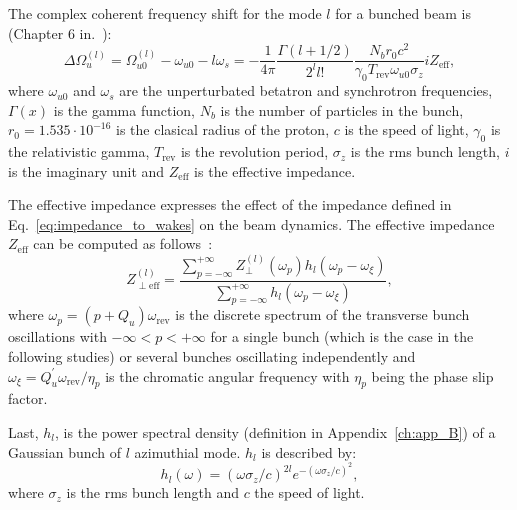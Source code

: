The complex coherent frequency shift for the mode $l$ for a bunched beam is (Chapter 6 in.~\cite{Chao:collective}): %
\begin{equation}\label{eq:complext_tune_shift_modes_m}
    \Delta \Omega_u ^{(l)}= \Omega_{u0}^{(l)}-\omega_{u0}-l\omega_s = -\frac{1}{4\pi}\frac{\Gamma(l+1/2)}{2^l l!}\frac{N_b r_0 c^2}{\gamma_0 T_\mathrm{rev} \omega_{u0} \sigma_z} i Z_\mathrm{eff},
\end{equation}
where $\omega_{u0}$ and $\omega_s$ are the unperturbated betatron and synchrotron frequencies, $\Gamma(x)$ is the gamma function, $N_b$ is the number of particles in the bunch, $r_0=1.535 \cdot 10^{-16}$ is the clasical radius of the proton, $c$ is the speed of light, $\gamma_0$ is the relativistic gamma, $T_\mathrm{rev}$ is the revolution period, $\sigma_z$ is the rms bunch length, $i$ is the imaginary unit and $Z_\mathrm{eff}$ is the effective impedance.


The effective impedance expresses the effect of the impedance defined in Eq.~\eqref{eq:impedance_to_wakes} on the beam dynamics. The effective impedance $Z_\mathrm{eff}$ can be computed as follows~\cite{Chao:collective}:
\begin{equation}\label{eq:effective_impedance}
    Z_{\perp \mathrm{eff}}^{(l)} = \frac{\sum_{p=-\infty}^{+ \infty}Z_{\perp }^{(l)}(\omega_{p}) h_l(\omega_{p}-\omega_\xi)}{\sum_{p=-\infty}^{+ \infty}h_l(\omega_{p}-\omega_\xi)},
\end{equation}
where $\omega_p = (p+Q_u)\omega_\mathrm{rev}$ is the discrete spectrum of the transverse bunch oscillations with $-\infty < p < + \infty$ for a single bunch (which is the case in the following studies) or several bunches oscillating independently and $\omega_\xi = Q_u^\prime \omega_\mathrm{rev} / \eta_p$ is the chromatic angular frequency with $\eta_p$ being the phase slip factor.

Last, $h_l$, is the power spectral density (definition in Appendix~\ref{ch:app_B}) of a Gaussian bunch of $l$ azimuthial mode. $h_l$ is described by: %
\begin{equation}\label{eq:spectral_density_of_gaussian_bunch}
    h_l(\omega) = (\omega \sigma_z/c)^{2l} e^{-(\omega \sigma_z/c)^2},
\end{equation}
where $\sigma_z$ is the rms bunch length and $c$ the speed of light.

